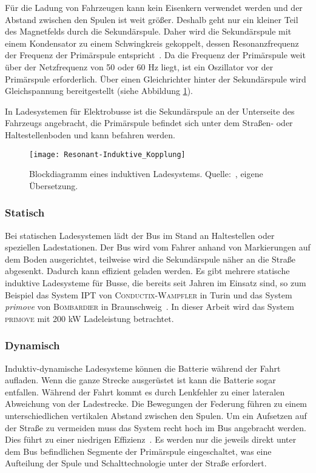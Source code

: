 Für die Ladung von Fahrzeugen kann kein Eisenkern verwendet werden und der Abstand zwischen den Spulen ist weit größer. Deshalb geht nur ein kleiner Teil des Magnetfelds durch die Sekundärspule. Daher wird die Sekundärspule mit einem Kondensator zu einem Schwingkreis gekoppelt, dessen Resonanzfrequenz der Frequenz der Primärspule entspricht~\cite{Kurs06072007}. Da die Frequenz der Primärspule weit über der Netzfrequenz von 50 oder 60 Hz liegt, ist ein Oszillator vor der Primärspule erforderlich. Über einen Gleichrichter hinter der Sekundärspule wird Gleichspannung bereitgestellt (siehe Abbildung \ref{abb_ResIndKopplung}).

In Ladesystemen für Elektrobusse ist die Sekundärspule an der Unterseite des Fahrzeugs angebracht, die Primärspule befindet sich unter dem Straßen- oder Haltestellenboden und kann befahren werden.

\begin{figure}\centering
	\texttt{[image: Resonant-Induktive\_Kopplung]}
	\caption[Blockdiagramm eines induktiven Ladesystems]{Blockdiagramm eines induktiven Ladesystems. Quelle:~\cite{lukic2013cutting}, eigene Übersetzung.}
	\label{abb_ResIndKopplung}
\end{figure}

\subsubsection{Statisch}
Bei statischen Ladesystemen lädt der Bus im Stand an Haltestellen oder speziellen Ladestationen. Der Bus wird vom Fahrer anhand von Markierungen auf dem Boden ausgerichtet, teilweise wird die Sekundärspule näher an die Straße abgesenkt. Dadurch kann effizient geladen werden. Es gibt mehrere statische induktive Ladesysteme für Busse, die bereits seit Jahren im Einsatz sind, so zum Beispiel das System \textsc{IPT} von \textsc{Conductix-Wampfler} in Turin und das System \emph{primove} von \textsc{Bombardier} in Braunschweig~\cite{WeIPT}. In dieser Arbeit wird das System \textsc{primove} mit 200 kW Ladeleistung betrachtet.

\subsubsection{Dynamisch}
Induktiv-dynamische Ladesysteme können die Batterie während der Fahrt aufladen. Wenn die ganze Strecke ausgerüstet ist kann die Batterie sogar entfallen. Während der Fahrt kommt es durch Lenkfehler zu einer lateralen Abweichung von der Ladestrecke. Die Bewegungen der Federung führen zu einem unterschiedlichen vertikalen Abstand zwischen den Spulen. Um ein Aufsetzen auf der Straße zu vermeiden muss das System recht hoch im Bus angebracht werden. Dies führt zu einer niedrigen Effizienz~\cite{5618092}. Es werden nur die jeweils direkt unter dem Bus befindlichen Segmente der Primärspule eingeschaltet, was eine Aufteilung der Spule und Schalttechnologie unter der Straße erfordert.

